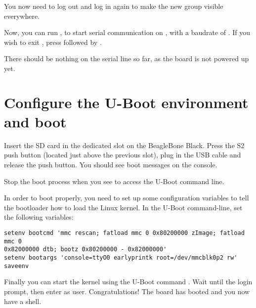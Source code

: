 You now need to log out and log in again to make the new group
visible everywhere.

Now, you can run , to start serial
communication on , with a baudrate of . If
you wish to exit , press \code{[Ctrl][a]} followed by
\code{[Ctrl][x]}.

There should be nothing on the serial line so far, as the board is not
powered up yet.

\section{Configure the U-Boot environment and boot}

Insert the SD card in the dedicated slot on the BeagleBone Black. Press the S2
push button (located just above the previous slot), plug in the USB cable and
release the push button. You should see boot messages on the console.

Stop the boot process when you see  to
access the U-Boot command line.

In order to boot properly, you need to set up some configuration variables to
tell the bootloader how to load the Linux kernel. In the U-Boot command-line,
set the following variables:
\begin{verbatim}
setenv bootcmd 'mmc rescan; fatload mmc 0 0x80200000 zImage; fatload mmc 0
0x82000000 dtb; bootz 0x80200000 - 0x82000000'
setenv bootargs 'console=ttyO0 earlyprintk root=/dev/mmcblk0p2 rw'
saveenv
\end{verbatim}

Finally you can start the kernel using the U-Boot command . Wait
until the login prompt, then enter  as user. Congratulations! The
board has booted and you now have a shell.
